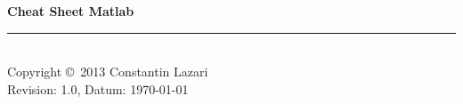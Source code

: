 \documentclass[10pt,landscape]{scrartcl}
\begin{document}
	\raggedright
	\footnotesize
	\begin{multicols}{3}


	\setlength{\premulticols}{1pt}
	\setlength{\postmulticols}{1pt}
	\setlength{\multicolsep}{1pt}
	\setlength{\columnsep}{2pt}
	\newlength{\MyLenA}
	\newlength{\MyLenB}

	\begin{center}
	\Large{\textbf{Cheat Sheet Matlab}} \\
	\end{center}

	
	
	

	\rule{0.3\linewidth}{0.25pt}\\
	\scriptsize
	Copyright \copyright\ 2013 Constantin Lazari\\
	Revision: 1.0, Datum: \today\\
	\end{multicols}
\end{document}

